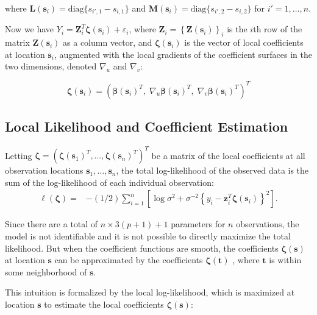 \documentclass[12pt,english,authoryear, review]{article}\usepackage[]{graphicx}\usepackage[]{color}
\theoremstyle{plain}
\theoremstyle{plain}
\begin{document}
where $\bm{L}\left(\bm{s}_{i}\right)=\text{diag}\{s_{i',1}-s_{i,1}\}$
and $\bm{M}\left(\bm{s}_{i}\right)=\text{diag}\{s_{i',2}-s_{i,2}\}$
for $i'=1,\dots,n$.

Now we have $Y_{i}=\bm{Z}_{i}^{T}\bm{\zeta}(\bm{s}_{i})+\varepsilon_{i}$,
where $\bm{Z}_{i}=\left\{ \bm{Z}(\bm{s}_{i})\right\} _{i}$ is the
$i$th row of the matrix $\bm{Z}(\bm{s}_{i})$ as a column vector,
and $\bm{\zeta}(\bm{s}_{i})$ is the vector of local coefficients
at location $\bm{s}_{i}$, augmented with the local gradients of the
coefficient surfaces in the two dimensions, denoted $\nabla_{u}$
and $\nabla_{v}$:

\begin{equation}
\bm{\zeta}(\bm{s}_{i})=\left(\bm{\beta}(\bm{s}_{i})^{T},\;\nabla_{u}\bm{\beta}(\bm{s}_{i})^{T},\;\nabla_{v}\bm{\beta}(\bm{s}_{i})^{T}\right)^{T}\label{eq:augmented-coefficients}
\end{equation}



\subsection{Local Likelihood and Coefficient Estimation}

Letting $\bm{\zeta}=\left(\bm{\zeta}\left(\bm{s}_{1}\right)^{T},\dots,\bm{\zeta}\left(\bm{s}_{n}\right)^{T}\right)^{T}$
be a matrix of the local coefficients at all observation locations
$\bm{s}_{1},\dots,\bm{s}_{n}$, the total log-likelihood of the observed
data is the sum of the log-likelihood of each individual observation:
\begin{align}
\ell\left(\bm{\zeta}\right)= & -(1/2)\sum_{i=1}^{n}\left[\log{\sigma^{2}}+\sigma^{-2}\left\{ y_{i}-\bm{z}_{i}^{T}\bm{\zeta}(\bm{s}_{i})\right\} ^{2}\right].\label{eq:coefficients}
\end{align}


Since there are a total of $n\times3(p+1)+1$ parameters for $n$
observations, the model is not identifiable and it is not possible
to directly maximize the total likelihood. But when the coefficient
functions are smooth, the coefficients $\bm{\zeta}\left(\bm{s}\right)$
at location $\bm{s}$ can be approximated by the coefficients $\bm{\zeta}\left(\bm{t}\right)$
, where $\bm{t}$ is within some neighborhood of $\bm{s}$.

This intuition is formalized by the local log-likelihood, which is
maximized at location $\bm{s}$ to estimate the local coefficients
$\bm{\zeta}(\bm{s})$:
\end{document}
